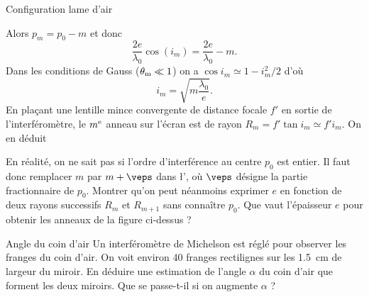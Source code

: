 \begin{exo}[PC][1][TD]{Configuration lame d'air}
\begin{quest}
{ Alors $p_{m}=p_{0}-m$ et donc
$$
   \frac{2e}{\lambda_0}\cos(i_m)=\frac{2e}{\lambda_0}-m.
$$
   Dans les conditions de Gauss ($\theta_{\rm m}\ll 1$) on a $\cos i_m\simeq 1-i_{m}^2/2$ d'où
$$
  i_{m}=\sqrt{m\frac{\lambda_0}{e}}.
$$
 En plaçant une lentille mince convergente de distance focale $f'$ en sortie de l'interféromètre, le $m^{\rm e}$ anneau sur l'écran est de rayon $R_{m}=f'\tan i_{m} \simeq f' i_m$. On en déduit 
 }
\item En réalité, on ne sait pas si l'ordre d'interférence au centre $p_0$ est entier. Il faut donc remplacer $m$ par $m+\veps$ dans \l', où $\veps$ désigne la partie fractionnaire de $p_0$. Montrer qu'on peut néanmoins exprimer $e$ en fonction de deux rayons successifs $R_m$ et $R_{m+1}$ sans connaître $p_0$. Que vaut l'épaisseur $e$ pour obtenir les anneaux de la figure ci-dessus ?
\end{quest}
\end{exo}

\begin{exo}[PC]{Angle du coin d'air}
Un interféromètre de Michelson est réglé pour observer les franges du coin d'air. On voit environ 40 franges rectilignes sur les \SI{1.5}{cm} de largeur du miroir. En déduire une estimation de l'angle $\alpha$ du coin d'air que forment les deux miroirs. Que se passe-t-il si on augmente $\alpha$ ?
\end{exo}

